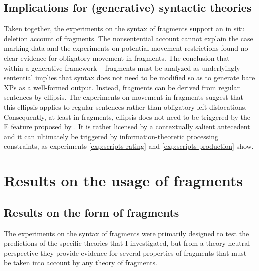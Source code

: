\subsection{Implications for (generative) syntactic theories}
Taken together, the experiments on the syntax of fragments support an in situ deletion account of fragments. The nonsentential account cannot explain the case marking data and the experiments on potential movement restrictions found no clear evidence for obligatory movement in fragments. The conclusion that -- within a generative framework -- fragments must be analyzed as underlyingly sentential implies that syntax does not need to be modified so as to generate bare XPs as a well-formed output. Instead, fragments can be derived from regular sentences by ellipsis. The experiments on movement in fragments suggest that this ellipsis applies to regular sentences rather than obligatory left dislocations. Consequently, at least in fragments, ellipsis does not need to be triggered by the E feature proposed by \citet{merchant2004}. It is rather licensed by a contextually salient antecedent and it can ultimately be triggered by information-theoretic processing constraints, as experiments \ref{exp:scripts-rating} and \ref{exp:scripts-production} show.

\section{Results on the usage of fragments}
\subsection{Results on the form of fragments}

The experiments on the syntax of fragments were primarily designed to test the predictions of the specific theories that I investigated, but from a theory-neutral perspective they provide evidence for several properties of fragments that must be taken into account by any theory of fragments. 

